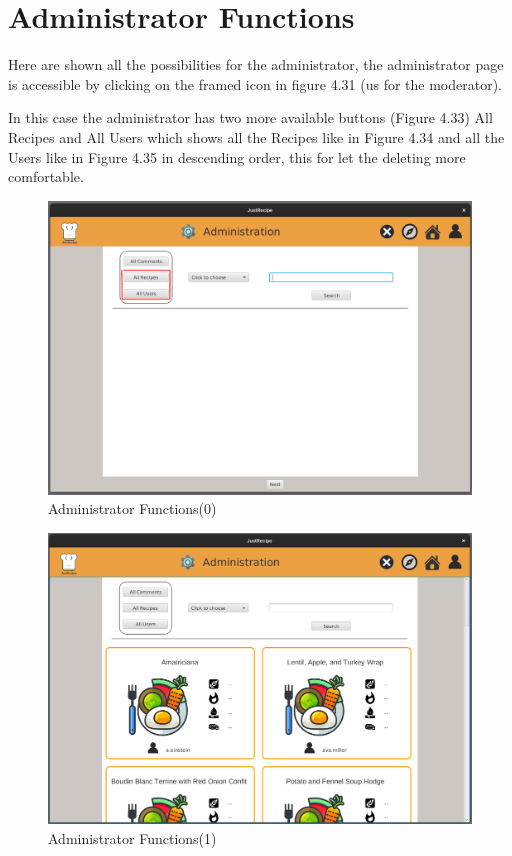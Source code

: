 \documentclass[a4paper]{report}
\begin{document}
\section{Administrator Functions}
Here are shown all the possibilities for the administrator, the administrator page is accessible by clicking on the framed icon in figure 4.31 (us for the moderator).

\noindent In this case the administrator has two more available buttons (Figure 4.33) All Recipes and All Users which shows all the Recipes like in Figure 4.34 and all the Users like in Figure 4.35 in descending order, this for let the deleting more comfortable.
\begin{figure}[htpb]
	\centering
	\includegraphics[scale=0.37]{img/user_manual/administratorFunction0.png}
	\caption{Administrator Functions(0)}
\end{figure}
\begin{figure}[htpb]
	\centering
	\includegraphics[scale=0.37]{img/user_manual/administratorFunction1.png}
	\caption{Administrator Functions(1)}
\end{figure}
\end{document}

